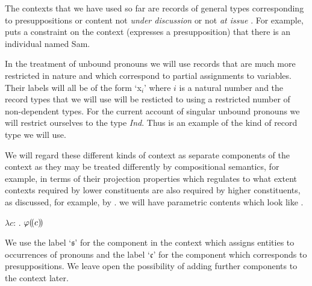 The
contexts that we have used so far are records of general types corresponding to presuppositions
\citep{BeaverGeurts2014} or content not \textit{under discussion}
\citep{Ginzburg1994,Ginzburg2012}  or not \textit{at issue}
\citep{Potts2005}.  For example, \nexteg{} puts a constraint on the
context (expresses a presupposition) that there is an individual named
Sam.
\begin{ex} 
\end{ex} 
In the treatment of unbound pronouns we will use records that are much
more restricted in nature and which correspond to partial assignments to 
variables.  Their labels will all be of the form `x$_i$' where $i$ is
a natural number and the record types that we will use will be
resticted to using a restricted number of non-dependent types. For the
current account of singular unbound pronouns we will restrict
ourselves to the type \textit{Ind}.  Thus \nexteg{} is an example of
the kind of record type we will use.
\begin{ex} 
\end{ex} 
  
We will regard these different kinds of
context as separate components of the context as they may be treated differently by compositional
semantics, for example, in terms of their projection properties which
regulates to what extent contexts required by lower constituents are
also required by higher constituents, as discussed, for example, by
\cite{Potts2005}.  we will have parametric
contents which look like \nexteg{}.
\begin{ex} 
$\lambda c$: . $\varphi(\!(c)\!)$ 
\end{ex}

We use the label `$\mathfrak{s}$' for the component in the context which
assigns entities to occurrences of pronouns and the label
`$\mathfrak{c}$' for the component which corresponds to
presuppositions.  We leave open the possibility of adding further
components to the context later.

